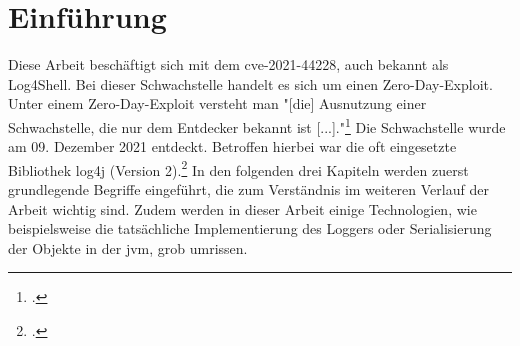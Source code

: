 
\section{Einführung}\label{sec:einfuhrung}
Diese Arbeit beschäftigt sich mit dem \gls{cve}-2021-44228, auch bekannt als Log4Shell. Bei dieser Schwachstelle handelt es sich
um einen Zero-Day-Exploit. Unter einem Zero-Day-Exploit versteht man "[die] Ausnutzung einer Schwachstelle, die nur dem Entdecker bekannt ist [...]."\footcite{bsizeroday}
Die Schwachstelle wurde am 09. Dezember 2021 entdeckt. Betroffen hierbei war die oft eingesetzte Bibliothek log4j (Version 2).\footcite{lunasec} In den
folgenden drei Kapiteln werden zuerst grundlegende Begriffe eingeführt, die zum Verständnis im weiteren Verlauf der Arbeit wichtig sind.
Zudem werden in dieser Arbeit einige Technologien, wie beispielsweise die tatsächliche Implementierung des Loggers oder Serialisierung der Objekte in der
\gls{jvm}, grob umrissen.



